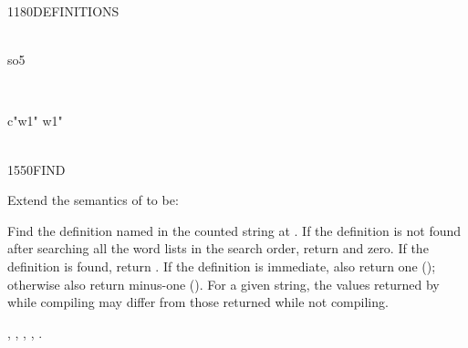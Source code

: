 \begin{worddef}{1180}{DEFINITIONS}
\begin{testing}
		   \\
		\word{:} so5       \word{;}

		 \\

		\word{:} c"w1"  w1" \word{;} \\
		 \\
	\end{testing}
\end{worddef}


\begin{worddef}{1550}{FIND}
\item Extend the semantics of  to be:


	Find the definition named in the counted string at .
	If the definition is not found after searching all the word lists
	in the search order, return  and zero. If
	the definition is found, return . If the definition is
	immediate, also return one (); otherwise also return
	minus-one (). For a given string, the values returned
	by  while compiling may differ from those returned
	while not compiling.

\see {},
	,
	,
	,
	.

	\begin{implement}


\end{implement}
\end{worddef}
